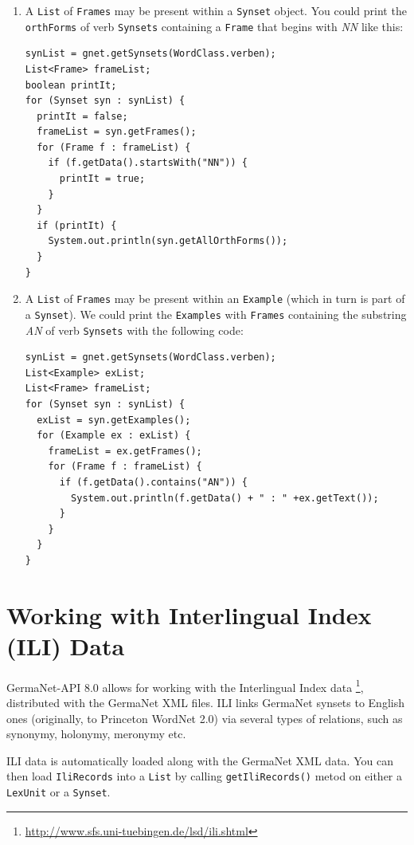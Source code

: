 \documentclass[12pt,a4paper,english,utf8]{report}
\begin{document}
\renewcommand{\labelenumi}{\arabic{enumi}}
\begin{enumerate}
	\item A \texttt{List} of \texttt{Frames} may be present within a \texttt{Synset} object. You could print the \texttt{orthForms} of verb \texttt{Synsets} containing a \texttt{Frame} that begins with \emph{NN} like this:
	
\begin{lstlisting}
synList = gnet.getSynsets(WordClass.verben);
List<Frame> frameList;
boolean printIt;
for (Synset syn : synList) {
  printIt = false;
  frameList = syn.getFrames();
  for (Frame f : frameList) {
    if (f.getData().startsWith("NN")) {
      printIt = true;
    }
  }
  if (printIt) {
    System.out.println(syn.getAllOrthForms());
  }
}
\end{lstlisting}

\item A \texttt{List} of \texttt{Frames} may be present within an \texttt{Example} (which in turn is part of a \texttt{Synset}). We could print the \texttt{Examples} with \texttt{Frames} containing the substring \emph{AN} of verb \texttt{Synsets} with the following code:

\begin{lstlisting}
synList = gnet.getSynsets(WordClass.verben);
List<Example> exList;
List<Frame> frameList;
for (Synset syn : synList) {
  exList = syn.getExamples();
  for (Example ex : exList) {
    frameList = ex.getFrames();
    for (Frame f : frameList) {
      if (f.getData().contains("AN")) {
        System.out.println(f.getData() + " : " +ex.getText());
      }
    }
  }
}
\end{lstlisting}

\end{enumerate}



\section{Working with Interlingual Index (ILI) Data}
GermaNet-API 8.0 allows for working with the Interlingual Index data \footnote{\url{http://www.sfs.uni-tuebingen.de/lsd/ili.shtml}}, distributed with the GermaNet XML files. ILI links GermaNet synsets to English ones (originally, to Princeton WordNet 2.0) via several types of relations, such as synonymy, holonymy, meronymy etc. 

ILI data is automatically loaded along with the GermaNet XML data. You can then load \texttt{IliRecords} into a \texttt{List} by calling \texttt{getIliRecords()} metod on either a \texttt{LexUnit} or a \texttt{Synset}. 
\end{document}
